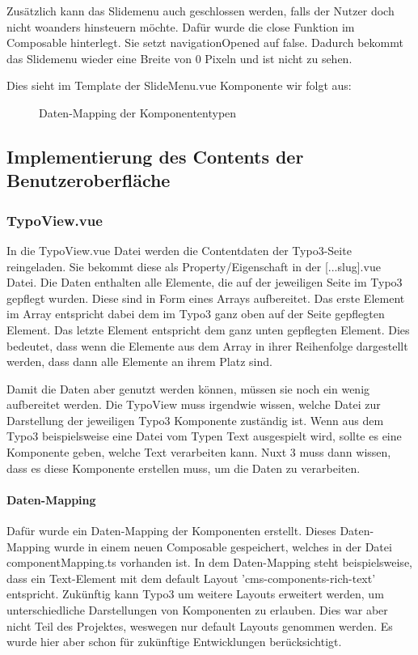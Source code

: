Zusätzlich kann das Slidemenu auch geschlossen werden, falls der Nutzer doch nicht woanders hinsteuern möchte. Dafür wurde die close Funktion im Composable hinterlegt. Sie setzt navigationOpened auf false. Dadurch bekommt das Slidemenu wieder eine Breite von 0 Pixeln und ist nicht zu sehen.

Dies sieht im Template der SlideMenu.vue Komponente wir folgt aus:
\begin{figure}[htb]
\centering
{}
\caption{Daten-Mapping der Komponententypen}
\end{figure}

\subsection{Implementierung des Contents der Benutzeroberfläche}
\label{sec:Implementierung des Contents der ImplementierungBenutzeroberflaeche}

\subsubsection{TypoView.vue}
\label{sec:TypoView.vue}

In die TypoView.vue Datei werden die Contentdaten der Typo3-Seite reingeladen. Sie bekommt diese als Property/Eigenschaft in der [...slug].vue Datei. Die Daten enthalten alle Elemente, die auf der jeweiligen Seite im Typo3 gepflegt wurden. Diese sind in Form eines Arrays aufbereitet. Das erste Element im Array entspricht dabei dem im Typo3 ganz oben auf der Seite gepflegten Element. Das letzte Element entspricht dem ganz unten gepflegten Element. Dies bedeutet, dass wenn die Elemente aus dem Array in ihrer Reihenfolge dargestellt werden, dass dann alle Elemente an ihrem Platz sind. 

Damit die Daten aber genutzt werden können, müssen sie noch ein wenig aufbereitet werden. Die TypoView muss irgendwie wissen, welche Datei zur Darstellung der jeweiligen Typo3 Komponente zuständig ist. Wenn aus dem Typo3 beispielsweise eine Datei vom Typen Text ausgespielt wird, sollte es eine Komponente geben, welche Text verarbeiten kann. Nuxt 3 muss dann wissen, dass es diese Komponente erstellen muss, um die Daten zu verarbeiten.

\paragraph{Daten-Mapping}

Dafür wurde ein Daten-Mapping der Komponenten erstellt. Dieses Daten-Mapping wurde in einem neuen Composable gespeichert, welches in der Datei componentMapping.ts vorhanden ist. In dem Daten-Mapping steht beispielsweise, dass ein Text-Element mit dem default Layout 'cms-components-rich-text' entspricht. Zukünftig kann Typo3 um weitere Layouts erweitert werden, um unterschiedliche Darstellungen von Komponenten zu erlauben. Dies war aber nicht Teil des Projektes, weswegen nur default Layouts genommen werden. Es wurde hier aber schon für zukünftige Entwicklungen berücksichtigt.

